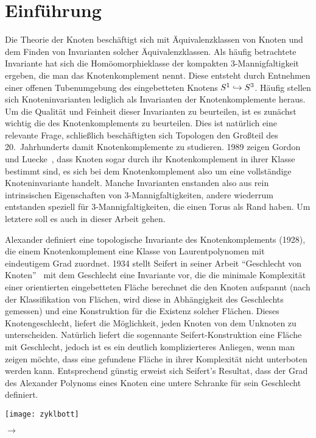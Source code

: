 \section{Einführung}
		
	\begin{minipage}[t][\textheight][t]{0.76\textwidth}

	Die Theorie der Knoten beschäftigt sich mit Äquivalenzklassen von Knoten und dem Finden von Invarianten solcher Äquivalenzklassen. Als häufig betrachtete Invariante hat sich die Homöomorphieklasse der kompakten 3-Mannigfaltigkeit ergeben, die man das Knotenkomplement nennt. Diese entsteht durch Entnehmen einer offenen Tubenumgebung des eingebetteten Knotens $S^1 \hookrightarrow S^3$. Häufig stellen sich Knoteninvarianten lediglich als Invarianten der Knotenkomplemente heraus. Um die Qualität und Feinheit dieser Invarianten zu beurteilen, ist es zunächst wichtig die des Knotenkomplements zu beurteilen. Dies ist natürlich eine relevante Frage, schließlich beschäftigten sich Topologen den Großteil des 20.~Jahrhunderts damit Knotenkomplemente zu studieren. 1989 zeigen Gordon und Luecke~\cite{Gordon.1989}, dass Knoten sogar durch ihr Knotenkomplement in ihrer Klasse bestimmt sind, es sich bei dem Knotenkomplement also um eine vollständige Knoteninvariante handelt. Manche Invarianten enstanden also aus rein intrinsischen Eigenschaften von 3-Mannigfaltigkeiten, andere wiederrum entstanden speziell für 3-Mannigfaltigkeiten, die einen Torus als Rand haben. Um letztere soll es auch in dieser Arbeit gehen.

	Alexander definiert eine topologische Invariante des Knotenkomplements \cite{Alexander.1928} (1928), die einem Knotenkomplement eine Klasse von Laurentpolynomen mit eindeutigem Grad zuordnet.  1934 stellt Seifert in seiner Arbeit "`Geschlecht von Knoten"'~\cite{Seifert.1934} mit dem Geschlecht eine Invariante vor, die die minimale Komplexität einer orientierten eingebetteten Fläche berechnet die den Knoten aufspannt (nach der Klassifikation von Flächen, wird diese in Abhängigkeit des Geschlechts gemessen) und eine Konstruktion für die Existenz solcher Flächen. Dieses Knotengeschlecht, liefert die Möglichkeit, jeden Knoten von dem Unknoten zu unterscheiden. Natürlich liefert die sogennante Seifert-Konstruktion eine Fläche mit Geschlecht, jedoch ist es ein deutlich komplizierteres Anliegen, wenn man zeigen möchte, dass eine gefundene Fläche in ihrer Komplexität nicht unterboten werden kann. Entsprechend günstig erweist sich Seifert's Resultat, dass der Grad des Alexander Polynoms eines Knoten eine untere Schranke für sein Geschlecht definiert. 


	\vfill
	\begin{minipage}[t]{0.7\textwidth}
		\texttt{[image: zyklbott]} 
	\end{minipage}
	\begin{minipage}[t]{0.2\textwidth}
	\vspace{-1cm}
	\huge$\longrightarrow$
	\vfill

	\end{minipage}
	\vspace{.63cm}
		 \label{fig:zykl}
	\end{minipage}

